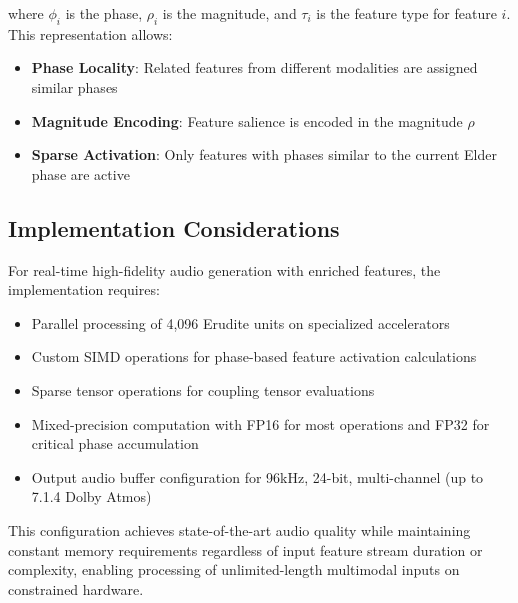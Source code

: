 where $\phi_i$ is the phase, $\rho_i$ is the magnitude, and $\tau_i$ is the feature type for feature $i$. This representation allows:

\begin{itemize}
    \item \textbf{Phase Locality}: Related features from different modalities are assigned similar phases
    \item \textbf{Magnitude Encoding}: Feature salience is encoded in the magnitude $\rho$
    \item \textbf{Sparse Activation}: Only features with phases similar to the current Elder phase are active
\end{itemize}

\subsection{Implementation Considerations}

For real-time high-fidelity audio generation with enriched features, the implementation requires:

\begin{itemize}
    \item Parallel processing of 4,096 Erudite units on specialized accelerators
    \item Custom SIMD operations for phase-based feature activation calculations
    \item Sparse tensor operations for coupling tensor evaluations
    \item Mixed-precision computation with FP16 for most operations and FP32 for critical phase accumulation
    \item Output audio buffer configuration for 96kHz, 24-bit, multi-channel (up to 7.1.4 Dolby Atmos)
\end{itemize}

This configuration achieves state-of-the-art audio quality while maintaining constant memory requirements regardless of input feature stream duration or complexity, enabling processing of unlimited-length multimodal inputs on constrained hardware.